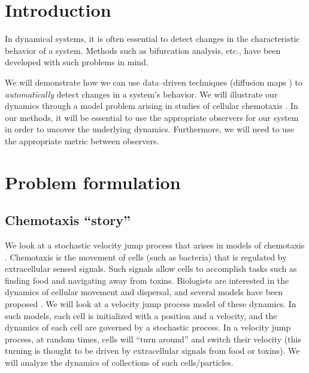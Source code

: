 \documentclass[prl, reprint, final]{revtex4-1}
\begin{document}

\maketitle

\section{Introduction} 
 
In dynamical systems, it is often essential to detect changes in the characteristic behavior of a system.
%
Methods such as bifurcation analysis, etc., have been developed with such problems in mind. 

We will demonstrate how we can use data--driven techniques (diffusion maps \cite{coifman2005geometric}) to {\em automatically} detect changes in a system's behavior.
%
We will illustrate our dynamics through a model problem arising in studies of cellular chemotaxis \cite{othmer2000diffusion}.
%
In our methods, it will be essential to use the appropriate observers for our system in order to uncover the underlying dynamics.
%
Furthermore, we will need to use the appropriate metric between observers.


\section{Problem formulation}

\subsection{Chemotaxis ``story''} 

We look at a stochastic velocity jump process that arises in models of chemotaxis \cite{othmer2000diffusion}.
%
Chemotaxis is the movement of cells (such as bacteria) that is regulated by extracellular sensed signals.
%
Such signals allow cells to accomplish tasks such as finding food and navigating away from toxins.
%
Biologists are interested in the dynamics of cellular movement and dispersal, and several models have been proposed \cite{othmer1988models, codling2008random}.
%
We will look at a velocity jump process model of these dynamics.
%
In such models, each cell is initialized with a position and a velocity, and the dynamics of each cell are governed by a stochastic process.
%
In a velocity jump process, at random times, cells will ``turn around'' and switch their velocity (this turning is thought to be driven by extracellular signals from food or toxins). 
%
We will analyze the dynamics of collections of such cells/particles. 
\end{document}
